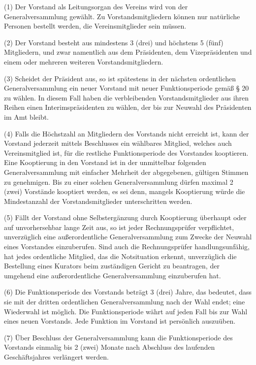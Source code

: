 \documentclass[11pt,a4paper]{article}
\begin{document}
(1)
Der Vorstand als Leitungsorgan des Vereins wird von der Generalversammlung gewählt.
Zu Vorstandsmitgliedern können nur natürliche Personen bestellt werden, die Vereinsmitglieder sein müssen.

(2)
Der Vorstand besteht aus mindestens 3 (drei) und höchstens 5 (fünf) Mitgliedern, und zwar namentlich aus dem Präsidenten, dem Vizepräsidenten und einem oder mehreren weiteren Vorstandsmitgliedern.

(3)
Scheidet der Präsident aus, so ist spätestens in der nächsten ordentlichen Generalversammlung ein neuer Vorstand mit neuer Funktionsperiode gemäß § 20 zu wählen.
In diesem Fall haben die verbleibenden Vorstandsmitglieder aus ihren Reihen einen Interimspräsidenten zu wählen, der bis zur Neuwahl des Präsidenten im Amt bleibt.

(4)
Falls die Höchstzahl an Mitgliedern des Vorstands nicht erreicht ist, kann der Vorstand jederzeit mittels Beschlusses ein wählbares Mitglied, welches auch Vereinsmitglied ist, für die restliche Funktionsperiode des Vorstandes kooptieren.
Eine Kooptierung in den Vorstand ist in der unmittelbar folgenden Generalversammlung mit einfacher Mehrheit der abgegebenen, gültigen Stimmen zu genehmigen.
Bis zu einer solchen Generalversammlung dürfen maximal 2 (zwei) Vorstände kooptiert werden, es sei denn, mangels Kooptierung würde die Mindestanzahl der Vorstandsmitglieder unterschritten werden.

(5)
Fällt der Vorstand ohne Selbstergänzung durch Kooptierung überhaupt oder auf unvorhersehbar lange Zeit aus, so ist jeder Rechnungsprüfer verpflichtet, unverzüglich eine außerordentliche Generalversammlung zum Zwecke der Neuwahl eines Vorstandes einzuberufen.
Sind auch die Rechnungsprüfer handlungsunfähig, hat jedes ordentliche Mitglied, das die Notsituation erkennt, unverzüglich die Bestellung eines Kurators beim zuständigen Gericht zu beantragen, der umgehend eine außerordentliche Generalversammlung einzuberufen hat.

(6)
Die Funktionsperiode des Vorstands beträgt 3 (drei) Jahre, das bedeutet, dass sie mit der dritten ordentlichen Generalversammlung nach der Wahl endet; eine Wiederwahl ist möglich.
Die Funktionsperiode währt auf jeden Fall bis zur Wahl eines neuen Vorstands.
Jede Funktion im Vorstand ist persönlich auszuüben.

(7)
Über Beschluss der Generalversammlung kann die Funktionsperiode des Vorstands einmalig bis 2 (zwei) Monate nach Abschluss des laufenden Geschäftsjahres verlängert werden.
\end{document}
